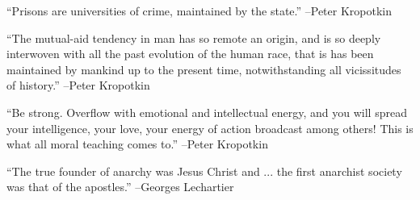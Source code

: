\documentclass{article}%
\begin{document}
\linebreak%
\vspace{1mm}%
\begin{minipage}{\textwidth}%
\flushleft%
“Prisons are universities of crime, maintained by the state.”%
\linebreak%
\vspace{1mm}%
–Peter Kropotkin%
\linebreak%
\vspace{1mm}%
\end{minipage}%
\linebreak%
\vspace{1mm}%
\begin{minipage}{\textwidth}%
\flushleft%
“The mutual{-}aid tendency in man has so remote an origin, and is so deeply interwoven with all the past evolution of the human race, that is has been maintained by mankind up to the present time, notwithstanding all vicissitudes of history.”%
\linebreak%
\vspace{1mm}%
–Peter Kropotkin%
\linebreak%
\vspace{1mm}%
\end{minipage}%
\linebreak%
\vspace{1mm}%
\begin{minipage}{\textwidth}%
\flushleft%
“Be strong. Overflow with emotional and intellectual energy, and you will spread your intelligence, your love, your energy of action broadcast among others! This is what all moral teaching comes to.”%
\linebreak%
\vspace{1mm}%
–Peter Kropotkin%
\linebreak%
\vspace{1mm}%
\end{minipage}%
\linebreak%
\vspace{1mm}%
\begin{minipage}{\textwidth}%
\flushleft%
“The true founder of anarchy was Jesus Christ and ... the first anarchist society was that of the apostles.”%
\linebreak%
\vspace{1mm}%
–Georges Lechartier%
\linebreak%
\vspace{1mm}%
\end{minipage}%
\linebreak%
\vspace{1mm}%
\end{document}
